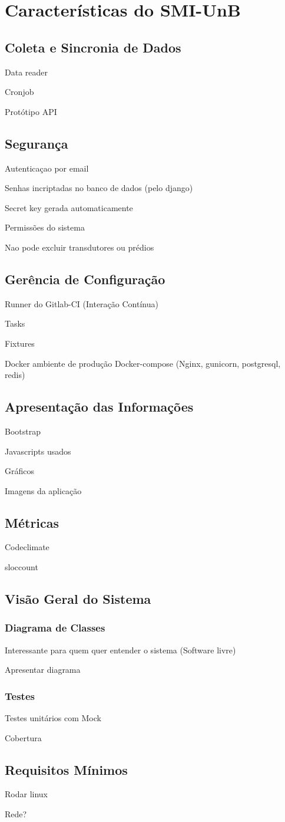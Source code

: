\chapter{Características do SMI-UnB}

\section{Coleta e Sincronia de Dados}
Data reader

Cronjob

Protótipo API
\section{Segurança}
Autenticaçao por email

Senhas incriptadas no banco de dados (pelo django)

Secret key gerada automaticamente

Permissões do sistema

Nao pode excluir transdutores ou prédios
\section{Gerência de Configuração}
Runner do Gitlab-CI (Interação Contínua)

Tasks

Fixtures

Docker
    ambiente de produção
    Docker-compose (Nginx, gunicorn, postgresql, redis)
\section{Apresentação das Informações}
Bootstrap

Javascripts usados

Gráficos

Imagens da aplicação
\section{Métricas}
Codeclimate

sloccount

\section{Visão Geral do Sistema}
    \subsection{Diagrama de Classes}
    Interessante para quem quer entender o sistema (Software livre)

    Apresentar diagrama
    \subsection{Testes}
    Testes unitários com Mock

    Cobertura
    \section{Requisitos Mínimos}
    Rodar linux

    Rede?
